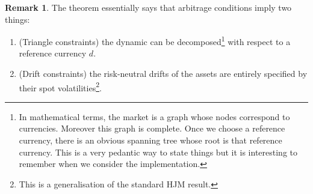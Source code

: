 \documentclass[11pt,english]{amsart}
\theoremstyle{definition}
\newtheorem{rema}{Remark}
\begin{document}
\begin{rema}
The theorem essentially says that arbitrage conditions imply two things: 
\begin{enumerate}
\item (Triangle constraints) the dynamic can be decomposed\footnote{In mathematical terms, the market is a graph whose nodes correspond to currencies. Moreover this graph is complete. Once we choose a reference currency, there is an obvious spanning tree whose root is that reference currency. This is a very pedantic way to state things but it is interesting to remember when we consider the implementation.} with respect to a reference currency $d$. 
\item (Drift constraints) the risk-neutral drifts of the assets are entirely specified by their spot volatilities\footnote{This is a generalisation of the standard HJM result.}. 
\end{enumerate}


\end{rema}
\end{document}
